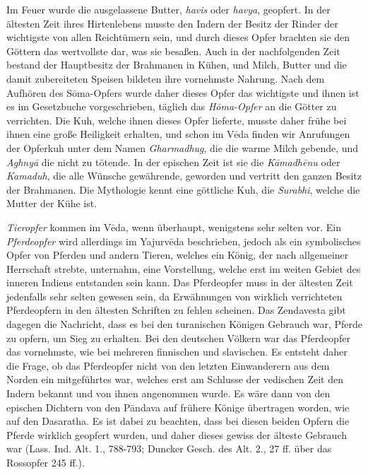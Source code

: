 \documentclass{article}
\begin{document}
Im Feuer wurde die ausgelassene Butter, \emph{havis} oder \emph{havya}, geopfert. In der ältesten Zeit ihres Hirtenlebens musste den Indern der Besitz der Rinder der wichtigste von allen Reichtümern sein, und durch dieses Opfer brachten sie den Göttern das wertvollste dar, was sie besaßen. Auch in der nachfolgenden Zeit bestand der Hauptbesitz der Brahmanen in Kühen, und Milch, Butter und die damit zubereiteten Speisen bildeten ihre vornehmste Nahrung. Nach dem Aufhören des S\={o}ma-Opfers wurde daher dieses Opfer das wichtigste und ihnen ist es im Gesetzbuche vorgeschrieben, täglich das \emph{H\={o}ma-Opfer} an die Götter zu verrichten. Die Kuh, welche ihnen dieses Opfer lieferte, musste daher frühe bei ihnen eine große Heiligkeit erhalten, und schon im V\={e}da finden wir Anrufungen der Opferkuh unter dem Namen \emph{Gharmadhug}, die die warme Milch gebende, und \emph{Aghny\={a}} die nicht zu tötende. In der epischen Zeit ist sie die \emph{K\={a}madh\={e}nu} oder \emph{Kamaduh}, die alle Wünsche gewährende, geworden und vertritt den ganzen Besitz der Brahmanen. Die Mythologie kennt eine göttliche Kuh, die \emph{Surabhi}, welche die Mutter der Kühe ist.

\emph{Tieropfer} kommen im V\={e}da, wenn überhaupt, wenigstens sehr selten vor. Ein \emph{Pferdeopfer} wird allerdings im Yajurv\={e}da beschrieben, jedoch als ein symbolisches Opfer von Pferden und andern Tieren, welches ein König, der nach allgemeiner Herrschaft strebte, unternahm, eine Vorstellung, welche erst im weiten Gebiet des inneren Indiens entstanden sein kann. Das Pferdeopfer muss in der ältesten Zeit jedenfalls sehr selten gewesen sein, da Erwähnungen von wirklich verrichteten Pferdeopfern in den ältesten Schriften zu fehlen scheinen. Das Zendavesta gibt dagegen die Nachricht, dass es bei den turanischen Königen Gebrauch war, Pferde zu opfern, um Sieg zu erhalten. Bei den deutschen Völkern war das Pferdeopfer das vornehmste, wie bei mehreren finnischen und slavischen. Es entsteht daher die Frage, ob das Pferdeopfer nicht von den letzten Einwanderern aus dem Norden ein mitgeführtes war, welches erst am Schlusse der vedischen Zeit den Indern bekannt und von ihnen angenommen wurde. Es wäre dann von den epischen Dichtern von den P\={a}ndava auf frühere Könige übertragen worden, wie auf den Dasaratha. Es ist dabei zu beachten, dass bei diesen beiden Opfern die Pferde wirklich geopfert wurden, und daher dieses gewiss der älteste Gebrauch war (Lass. Ind. Alt. 1., 788-793; Duncker Gesch. des Alt. 2., 27 ff. über das Rossopfer 245 ff.).
\end{document}

